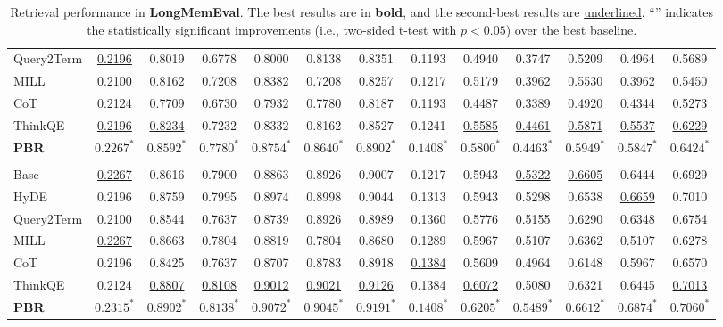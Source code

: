\begin{table}[ht]
\begin{tabular}{lcccccccccccc}
Query2Term & \underline{0.2196} & 0.8019 & 0.6778 & 0.8000 & 0.8138 & 0.8351 & 0.1193 & 0.4940 & 0.3747 & 0.5209 & 0.4964 & 0.5689 \\
MILL     & 0.2100 & 0.8162 & 0.7208 & 0.8382 & 0.7208 & 0.8257 & 0.1217 & 0.5179 & 0.3962 & 0.5530 & 0.3962 & 0.5450 \\
CoT      & 0.2124 & 0.7709 & 0.6730 & 0.7932 & 0.7780 & 0.8187 & 0.1193 & 0.4487 & 0.3389 & 0.4920 & 0.4344 & 0.5273 \\
ThinkQE & \underline{0.2196} & \underline{0.8234} & 0.7232 & 0.8332 & 0.8162 & 0.8527 & 0.1241 & \underline{0.5585} & \underline{0.4461} & \underline{0.5871} & \underline{0.5537} & \underline{0.6229} \\
\textbf{PBR} & $\mathbf{0.2267^*}$ & $\mathbf{0.8592^*}$ & $\mathbf{0.7780^*}$ & $\mathbf{0.8754^*}$ & $\mathbf{0.8640^*}$ & $\mathbf{0.8902^*}$ & $\mathbf{0.1408^*}$ & $\mathbf{0.5800^*}$ & $\mathbf{0.4463^*}$ & $\mathbf{0.5949^*}$ & $\mathbf{0.5847^*}$ & $\mathbf{0.6424^*}$ \\
\midrule
\rowcolor{gray!15}
\multicolumn{13}{c}{\textit{bge-base-en-v1.5}} \\
Base     & \underline{0.2267} & 0.8616 & 0.7900 & 0.8863 & 0.8926 & 0.9007 & 0.1217 & 0.5943 & \underline{0.5322} & \underline{0.6605} & 0.6444 & 0.6929 \\
HyDE     & 0.2196 & 0.8759 & 0.7995 & 0.8974 & 0.8998 & 0.9044 & 0.1313 & 0.5943 & 0.5298 & 0.6538 & \underline{0.6659} & 0.7010 \\
Query2Term & 0.2100 & 0.8544 & 0.7637 & 0.8739 & 0.8926 & 0.8989 & 0.1360 & 0.5776 & 0.5155 & 0.6290 & 0.6348 & 0.6754 \\
MILL     & \underline{0.2267} & 0.8663 & 0.7804 & 0.8819 & 0.7804 & 0.8680 & 0.1289 & 0.5967 & 0.5107 & 0.6362 & 0.5107 & 0.6278 \\
CoT      & 0.2196 & 0.8425 & 0.7637 & 0.8707 & 0.8783 & 0.8918 & \underline{0.1384} & 0.5609 & 0.4964 & 0.6148 & 0.5967 & 0.6570 \\
ThinkQE & 0.2124 & \underline{0.8807} & \underline{0.8108} & \underline{0.9012} & \underline{0.9021} & \underline{0.9126} & 0.1384 & \underline{0.6072} & 0.5080 & 0.6321 & 0.6445 & \underline{0.7013} \\
\textbf{PBR} & $\mathbf{0.2315^*}$ & $\mathbf{0.8902^*}$ & $\mathbf{0.8138^*}$ & $\mathbf{0.9072^*}$ & $\mathbf{0.9045^*}$ & $\mathbf{0.9191^*}$ & $\mathbf{0.1408^*}$ & $\mathbf{0.6205^*}$ & $\mathbf{0.5489^*}$ & $\mathbf{0.6612^*}$ & $\mathbf{0.6874^*}$ & $\mathbf{0.7060^*}$\\
\bottomrule
\end{tabular}
\caption{Retrieval performance in \textbf{LongMemEval}. The best results are in \textbf{bold}, and the second-best results are \underline{underlined}. ``\textbf{{\Large *}}'' indicates the statistically significant improvements (i.e., two-sided t-test with $p<0.05$) over the best baseline. }
\label{tab:longmen_results}
\vspace{-10pt}
\end{table}



